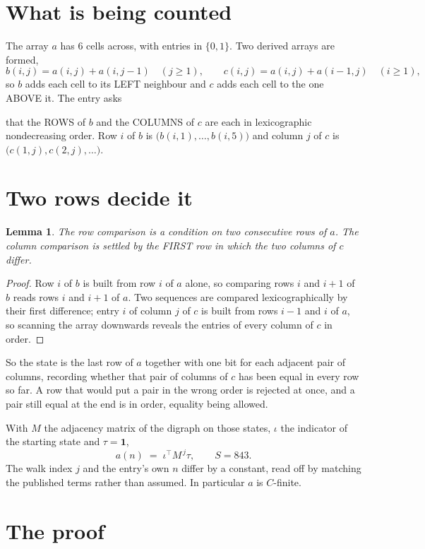 \documentclass[11pt,a4paper]{article}
\theoremstyle{plain}
\newtheorem{lemma}[theorem]{Lemma}
\theoremstyle{definition}
\begin{document}
\section{What is being counted}

The array $a$ has $6$ cells across, with entries in $\{0,1\}$. Two derived arrays are formed,
\[
b(i,j)=a(i,j)+a(i,j-1)\quad(j\ge1),\qquad c(i,j)=a(i,j)+a(i-1,j)\quad(i\ge1),
\]
so $b$ adds each cell to its LEFT neighbour and $c$ adds each cell to the one ABOVE it. The
entry asks

that the ROWS of $b$ and the COLUMNS of $c$ are each in lexicographic nondecreasing order. Row $i$ of $b$
is $\bigl(b(i,1),\dots,b(i,5)\bigr)$ and column $j$ of $c$ is
$\bigl(c(1,j),c(2,j),\dots\bigr)$.


\section{Two rows decide it}

\begin{lemma}\label{lem:win}
The row comparison is a condition on two consecutive rows of $a$. The column comparison is
settled by the FIRST row in which the two columns of $c$ differ.
\end{lemma}

\begin{proof}
Row $i$ of $b$ is built from row $i$ of $a$ alone, so comparing rows $i$ and $i+1$ of $b$ reads
rows $i$ and $i+1$ of $a$. Two sequences are compared lexicographically by their first
difference; entry $i$ of column $j$ of $c$ is built from rows $i-1$ and $i$ of $a$, so scanning
the array downwards reveals the entries of every column of $c$ in order.
\end{proof}

So the state is the last row of $a$ together with one bit for each adjacent pair of columns,
recording whether that pair of columns of $c$ has been equal in every row so far. A row that
would put a pair in the wrong order is rejected at once, and a pair still equal at the end is
in order, equality being allowed.

With $M$ the adjacency matrix of the digraph on those states, $\iota$ the indicator of the
starting state and $\tau=\mathbf{1}$,
\[
a(n)\;=\;\iota^{\!\top}M^{\,j}\tau ,\qquad S=843.
\]
The walk index $j$ and the entry's own $n$ differ by a constant, read off by matching the
published terms rather than assumed. In particular $a$ is $C$-finite.

\section{The proof}
\end{document}
